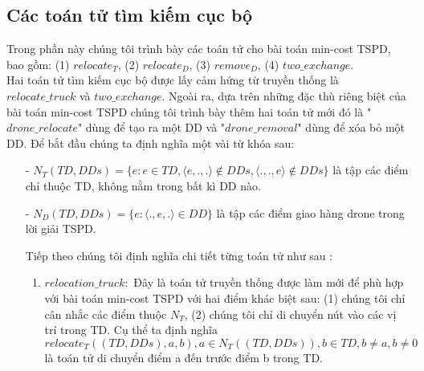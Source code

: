 \documentclass[a4paper,12pt]{report}
\begin{document}
\subsection{Các toán tử tìm kiếm cục bộ}
Trong phần này chúng tôi trình bày các toán tử  cho bài toán min-cost TSPD, bao gồm: (1) $relocate_T$, (2) $relocate_D$, (3) $remove_D$, (4) $two\_exchange$. \\

Hai toán tử tìm kiếm cục bộ được lấy cảm hứng từ truyền thống là $relocate\_truck$ và $two\_exchange$. Ngoài ra, dựa trên những đặc thù riêng biệt của bài toán min-cost TSPD chúng tôi trình bày thêm hai toán tử mới đó là "$drone\_relocate$" dùng để tạo ra một DD và "$drone\_removal$" dùng để xóa bỏ một DD. Để bắt đầu chúng ta định nghĩa một vài từ khóa sau:
\begin{itemize}
\item[-] $N_T(TD,DDs)=\{e:e \in TD,\langle e,.,. \rangle \notin DDs,\langle .,.,e \rangle \notin DDs\}$ là tập các điểm chỉ thuộc TD, không nằm trong bất kì DD nào.
\item[-] $N_D(TD,DDs)=\{e: \langle .,e,. \rangle \in DD\}$ là tập các điểm giao hàng drone trong lời giải TSPD.

Tiếp theo chúng tôi định nghĩa chi tiết từng toán tử như sau :
\begin{enumerate}
\item $relocation\_truck:$ Đây là toán tử truyền thống được làm mới để phù hợp với bài toán min-cost TSPD với hai điểm khác biệt sau: (1) chúng tôi chỉ cân nhắc các điểm thuộc $N_T$, (2) chúng tôi chỉ di chuyển nút vào các vị trí trong TD. Cụ thể ta định nghĩa
$$relocate_T((TD,DDs),a,b),a \in N_T((TD,DDs)),b \in TD, b \neq a, b \neq 0$$ 
là toán tử di chuyển điểm a đến trước điểm b trong TD.
\begin{figure}[H]

\end{figure}
\end{enumerate}
\end{itemize}
\end{document}
